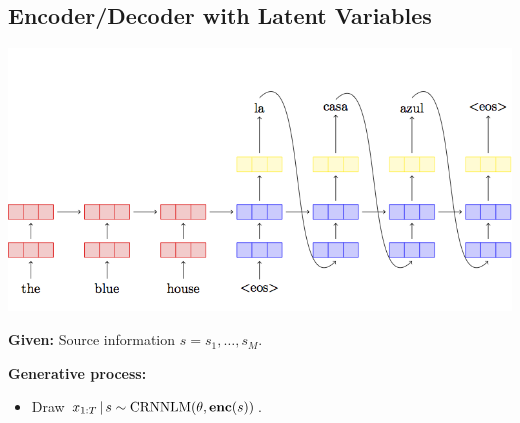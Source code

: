\subsection{Encoder/Decoder with Latent Variables}

\newcommand{\benc}{\boldsymbol{\mathrm{enc}}}

\begin{frame}
\begin{center}
\includegraphics[scale=0.55]{pics/seq2seq.png}
\end{center}

\textbf{Given:} Source information $s = s_1, \ldots, s_M$.
\air

\textbf{Generative process:}
  \begin{itemize}
      \item Draw $x_{1:T} \given s \sim \CRNNLM(\theta, \benc(s))$.
  \end{itemize}




\air
\end{frame}

